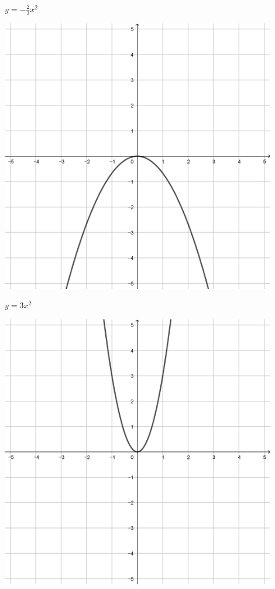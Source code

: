 \documentclass[a4paper]{oblivoir}
\begin{document}
\begin{minipage}{0.45\textwidth}\centering
\(y=-\frac23x^2\)
\par\bigskip\includegraphics[width=0.9\textwidth]{img/7-3}
\end{minipage}
\begin{minipage}{0.45\textwidth}\centering
\(y=3x^2\)
\par\bigskip\includegraphics[width=0.9\textwidth]{img/7-4}
\end{minipage}\bigskip\bigskip\par
\end{document}
